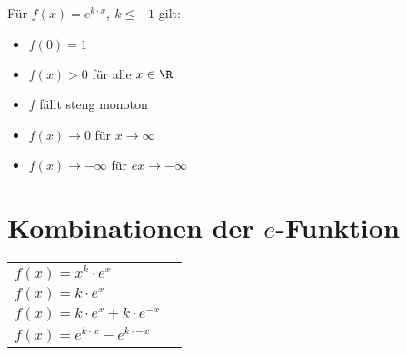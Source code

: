 \documentclass[10pt, a4paper, landscape, twocolumn]{scrartcl}
\begin{document}
     Für $f(x)=e^{k\cdot x},\ k \leq -1$ gilt:
    \begin{multicols}{2}
        
        \columnbreak
        
        \begin{itemize}
            \item $f(0)=1$
            \item $f(x)>0$ für alle $x\in \R$
            \item $f$ fällt steng monoton
            \item $f(x) \longrightarrow 0$ für $x \longrightarrow \infty$
            \item $f(x) \longrightarrow -\infty$ für $ex \longrightarrow -\infty$
        \end{itemize}
    \end{multicols}
    
    \section*{Kombinationen der $e$-Funktion}
    \begin{tabular}{lc}
        $f(x) = x^k\cdot e^x$ & \\
        $f(x) = k\cdot e^x$ & \\
        $f(x) = k\cdot e^x + k\cdot e^{-x}$ & \\
        $f(x) = e^{k\cdot x} - e^{k\cdot -x}$ & \\
    \end{tabular}
\end{document}
